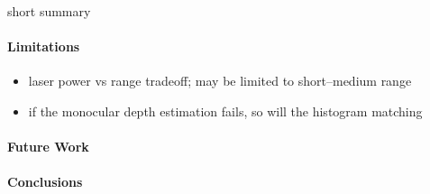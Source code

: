 short summary

\paragraph{Limitations}

\begin{itemize}
	\item laser power vs range tradeoff; may be limited to short--medium range
	\item if the monocular depth estimation fails, so will the histogram matching 
\end{itemize}

\paragraph{Future Work}


\paragraph{Conclusions}